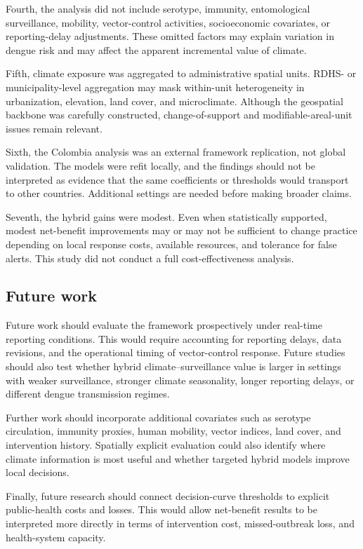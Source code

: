 \documentclass[11pt,a4paper]{article}
\begin{document}
Fourth, the analysis did not include serotype, immunity, entomological surveillance, mobility, vector-control activities, socioeconomic covariates, or reporting-delay adjustments. These omitted factors may explain variation in dengue risk and may affect the apparent incremental value of climate.

Fifth, climate exposure was aggregated to administrative spatial units. RDHS- or municipality-level aggregation may mask within-unit heterogeneity in urbanization, elevation, land cover, and microclimate. Although the geospatial backbone was carefully constructed, change-of-support and modifiable-areal-unit issues remain relevant.

Sixth, the Colombia analysis was an external framework replication, not global validation. The models were refit locally, and the findings should not be interpreted as evidence that the same coefficients or thresholds would transport to other countries. Additional settings are needed before making broader claims.

Seventh, the hybrid gains were modest. Even when statistically supported, modest net-benefit improvements may or may not be sufficient to change practice depending on local response costs, available resources, and tolerance for false alerts. This study did not conduct a full cost-effectiveness analysis.

\subsection{Future work}
\label{subsec:future-work}

Future work should evaluate the framework prospectively under real-time reporting conditions. This would require accounting for reporting delays, data revisions, and the operational timing of vector-control response. Future studies should also test whether hybrid climate--surveillance value is larger in settings with weaker surveillance, stronger climate seasonality, longer reporting delays, or different dengue transmission regimes.

Further work should incorporate additional covariates such as serotype circulation, immunity proxies, human mobility, vector indices, land cover, and intervention history. Spatially explicit evaluation could also identify where climate information is most useful and whether targeted hybrid models improve local decisions.

Finally, future research should connect decision-curve thresholds to explicit public-health costs and losses. This would allow net-benefit results to be interpreted more directly in terms of intervention cost, missed-outbreak loss, and health-system capacity.
\end{document}
